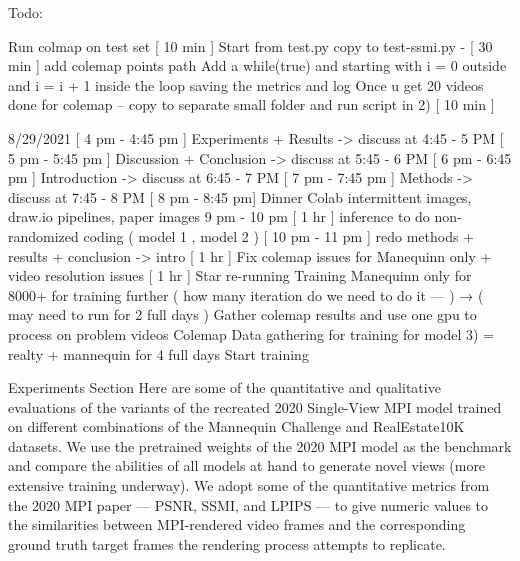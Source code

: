Todo:


Run colmap on test set  [ 10 min ] 
Start from test.py copy to test-ssmi.py - [ 30 min ]
add colemap points path
Add a while(true) and starting with i = 0 outside and i = i + 1 inside the loop 
saving the metrics and log 
Once u get 20 videos done for colemap -- copy to separate small folder and run script in 2) [ 10 min ] 

8/29/2021
[ 4 pm - 4:45 pm ] Experiments + Results -> discuss at 4:45 - 5 PM 
[ 5 pm - 5:45 pm ] Discussion + Conclusion -> discuss at 5:45 - 6 PM 
[ 6 pm - 6:45 pm ] Introduction -> discuss at 6:45 - 7 PM
[ 7 pm - 7:45 pm ] Methods -> discuss at 7:45 - 8 PM 
[ 8 pm - 8:45 pm] Dinner 
Colab intermittent images, draw.io pipelines, paper images
9 pm - 10 pm [ 1 hr ] inference to do non-randomized coding ( model 1 , model 2 ) 
 [ 10 pm - 11 pm ] redo methods + results + conclusion -> intro 
[ 1 hr ] Fix colemap issues for Manequinn only + video resolution issues 
[ 1 hr ] Star re-running Training Manequinn only for 8000+ for training further ( how many iteration do we need to do it --- ) → ( may need to run for 2 full days ) 
Gather colemap results and use one gpu to process on problem videos
Colemap Data gathering for training for model 3) = { realty + mannequin } for 4 full days 
Start training 




Experiments Section
Here are some of the quantitative and qualitative evaluations of the variants of the recreated 2020 Single-View MPI model trained on different combinations of the Mannequin Challenge and RealEstate10K datasets. We use the pretrained weights of the 2020 MPI model as the benchmark and compare the abilities of all models at hand to generate novel views (more extensive training underway). We adopt some of the quantitative metrics from the 2020 MPI paper \cite{single_view_mpi} --- PSNR, SSMI, and LPIPS --- to give numeric values to the similarities between MPI-rendered video frames and the corresponding ground truth target frames the rendering process attempts to replicate. 

